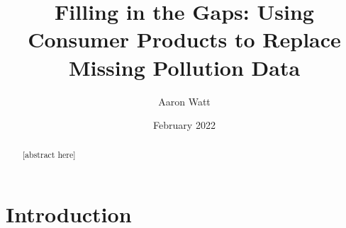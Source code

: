 \documentclass[12pt]{article}
\title{Filling in the Gaps: Using Consumer Products to Replace Missing Pollution Data}
\author{Aaron Watt}
\date{February 2022}
\begin{document}
\maketitle

\begin{abstract}


[abstract here]







\vspace{2em}
\end{abstract}






\section{Introduction} 
\label{introduction}

\end{document}
